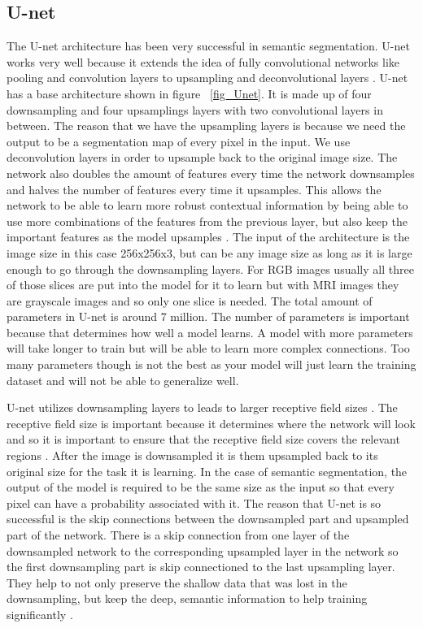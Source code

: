 \subsection{U-net}
%
The U-net architecture has been very successful in semantic segmentation. 
U-net works very well because it extends the idea of fully convolutional networks like pooling and convolution layers to upsampling and deconvolutional layers \cite{DBLP:journals/corr/RonnebergerFB15}.
U-net has a base architecture shown in figure ~\ref{fig_Unet}. 
It is made up of four downsampling and four upsamplings layers with two convolutional layers in between. 
The reason that we have the upsampling layers is because we need the output to be a segmentation map of every pixel in the input.
We use deconvolution layers in order to upsample back to the original image size. 
The network also doubles the amount of features every time the network downsamples and halves the number of features every time it upsamples. 
This allows the network to be able to learn more robust contextual information by being able to use more combinations of the features from the previous layer, but also keep the important features as the model upsamples \cite{DBLP:journals/corr/RonnebergerFB15}. 
The input of the architecture is the image size in this case 256x256x3, but can be any image size as long as it is large enough to go through the downsampling layers.
For RGB images usually all three of those slices are put into the model for it to learn but with MRI images they are grayscale images and so only one slice is needed. 
The total amount of parameters in U-net is around 7 million. 
The number of parameters is important because that determines how well a model learns. 
A model with more parameters will take longer to train but will be able to learn more complex connections. 
Too many parameters though is not the best as your model will just learn the training dataset and will not be able to generalize well. 


U-net utilizes downsampling layers to leads to larger receptive field sizes \cite{DBLP:journals/corr/LongSD14}. 
The receptive field size is important because it determines where the network will look and so it is important to ensure that the receptive field size covers the relevant regions \cite{NIPS2016_6203}.
After the image is downsampled it is them upsampled back to its original size for the task it is learning.
In the case of semantic segmentation, the output of the model is required to be the same size as the input so that every pixel can have a probability associated with it.
The reason that U-net is so successful is the skip connections between the downsampled part and upsampled part of the network.
There is a skip connection from one layer of the downsampled network to the corresponding upsampled layer in the network so the first downsampling part is skip connectioned to the last upsampling layer. 
They help to not only preserve the shallow data that was lost in the downsampling, but keep the deep, semantic information to help training significantly \cite{DBLP:journals/corr/LongSD14}.



